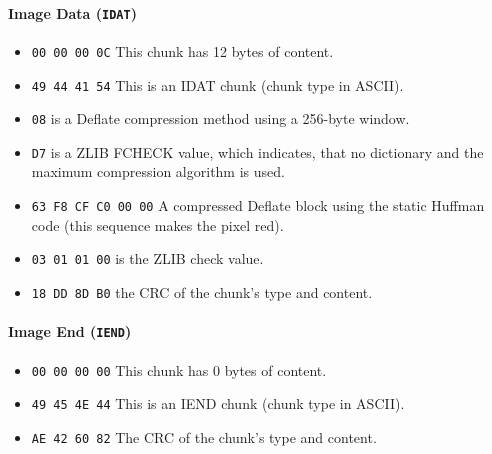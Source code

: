 \documentclass[runningheads]{llncs}
\begin{document}
\paragraph{Image Data (\texttt{IDAT})}

\begin{itemize}
    \item \texttt{\color{Violet}00 00 00 0C} This chunk has 12 bytes of content.
    \item \texttt{\color{Violet}49 44 41 54} This is an IDAT chunk (chunk type in ASCII).
    \item \texttt{\color{Violet}08} is a Deflate compression method using a 256-byte window.
    \item \texttt{\color{Violet}D7} is a ZLIB FCHECK value, which indicates, that no dictionary and the maximum compression algorithm is used.
    \item \texttt{\color{Violet}63 F8 CF C0 00 00} A compressed Deflate block using the static Huffman code (this sequence makes the pixel red).
    \item \texttt{\color{Violet}03 01 01 00} is the ZLIB check value.
    \item \texttt{\color{Violet}18 DD 8D B0} the CRC of the chunk's type and content.
\end{itemize}


\paragraph{Image End (\texttt{IEND})}
\begin{itemize}
    \item \texttt{\color{Plum}00 00 00 00} This chunk has 0 bytes of content.
    \item \texttt{\color{Plum}49 45 4E 44} This is an IEND chunk (chunk type in ASCII).
    \item \texttt{\color{Plum}AE 42 60 82} The CRC of the chunk's type and content.
\end{itemize}
\end{document}
